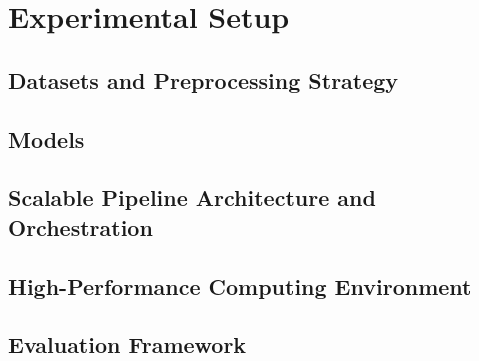 \chapter{Experimental Setup}
\label{chap:4}



\section{Datasets and Preprocessing Strategy}

\section{Models}

\section{Scalable Pipeline Architecture and Orchestration}

\section{High-Performance Computing Environment}

\section{Evaluation Framework}




